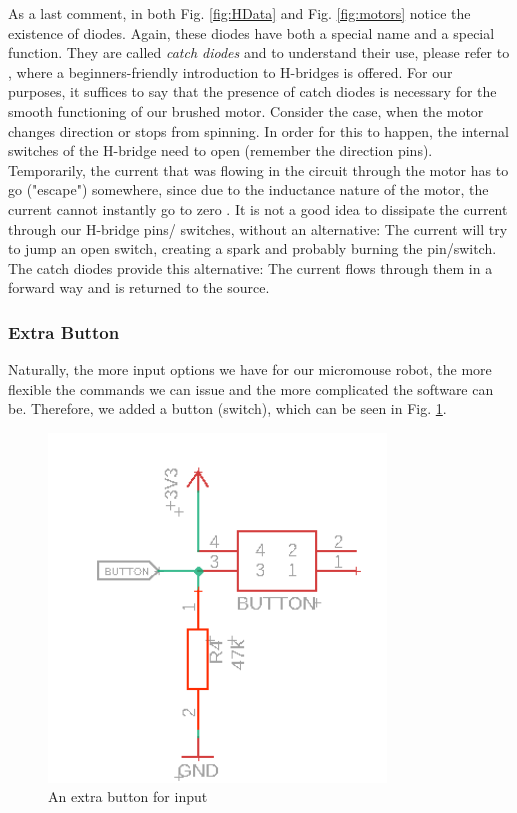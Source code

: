 As a last comment, in both Fig. \ref{fig:HData} and Fig. \ref{fig:motors} notice the existence of diodes. Again, these diodes have both a special name and a special function. They are called \textit{catch diodes} and to understand their use, please refer to \cite{catchDiodes}, where a beginners-friendly introduction to H-bridges is offered.
For our purposes, it suffices to say that the presence of catch diodes is necessary for the smooth functioning of our brushed motor. Consider the case, when the motor changes direction or stops from spinning. In order for this to happen, the internal switches of the H-bridge need to open (remember the direction pins). Temporarily, the current that was flowing in the circuit through the motor has to go ("escape") somewhere, since due to the inductance nature of the motor, the current cannot instantly go to zero . It is not a good idea to dissipate the current through our H-bridge pins/ switches, without an alternative: The current will try to jump an open switch, creating a spark and probably burning the pin/switch. The catch diodes provide this alternative: The current flows through them in a forward way and is returned to the source.

\vspace{1cm}


\subsubsection{Extra Button}

Naturally, the more input options we have for our micromouse robot, the more flexible the commands we can issue and the more complicated the software can be. Therefore, we added a button (switch), which can be seen in Fig. \ref{fig:button}.

\begin{figure}[htb]
    \centering
    \includegraphics[width=0.8\textwidth]{figures/hardware/Button.PNG}
    \caption{An extra button for input}
    \label{fig:button}
\end{figure}


